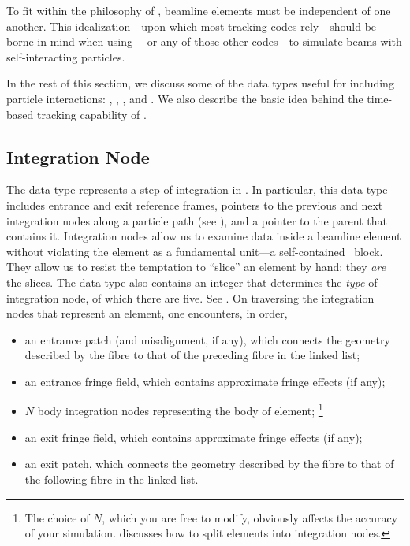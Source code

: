 To fit within the philosophy of \PTC, beamline elements must
be independent of one another. This idealization---upon which
most tracking codes rely---should be borne in mind when using
\PTC---or any of those other codes---to simulate beams with
self-interacting particles.%

\makeusother
In the rest of this section, we discuss some of the data
types useful for including particle interactions:
, , ,
and . We also describe the basic idea
behind the time-based tracking capability of \PTC.


\subsection{Integration Node}
\label{sec:integr.node}

%
The data type  represents a step of
integration in \PTC. In particular, this data type includes
entrance and exit reference frames, pointers to the previous
and next integration nodes along a particle path
(see ), and a pointer to the parent
 that contains it. Integration nodes allow us to
examine data inside a beamline element without violating the
element as a fundamental unit---a self-contained \LEGO\ block.
They allow us to resist the temptation to ``slice'' an element
by hand: they \emph{are} the slices. The data type
 also contains an integer that
determines the \emph{type} of integration node, of which there
are five. See . On traversing the integration
nodes that represent an element, one encounters, in order,
\begin{itemize}
  \item an entrance patch (and misalignment, if any), which
connects the geometry described by the fibre to that of the
preceding fibre in the linked list;
  \item an entrance fringe field, which contains approximate
fringe effects (if any);
  \item $N$ body integration nodes representing the body of element;%
\footnote{The choice of $N$, which you are free to modify,
obviously affects the accuracy of your simulation.
 discusses how to split elements into
integration nodes.}
  \item an exit fringe field, which contains approximate fringe
effects (if any);
  \item an exit patch, which connects the geometry described by
the fibre to that of the following fibre in the linked list.
\end{itemize}



